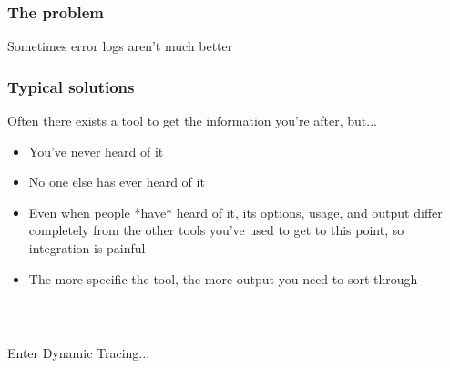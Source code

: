 \documentclass{beamer}
\begin{document}
\begin{frame}
    \frametitle{The problem}
    Sometimes error logs aren't much better
    \begin{figure}[b]
    \begin{centering}
    \end{centering}
    \end{figure}
\end{frame}

\begin{frame}
    \frametitle{Typical solutions}
    Often there exists a tool to get the information you're after, but...
    \begin{itemize}
        \item<2->You've never heard of it
        \item<3->No one else has ever heard of it
        \item<4->Even when people *have* heard of it, its options, usage, and output differ completely from the other tools you've used to get to this point, so integration is painful
        \item<5->The more specific the tool, the more output you need to sort through
    \end{itemize}
\end{frame}

\begin{frame}
    \frametitle{~}
    Enter Dynamic Tracing...
\end{frame}
\end{document}
